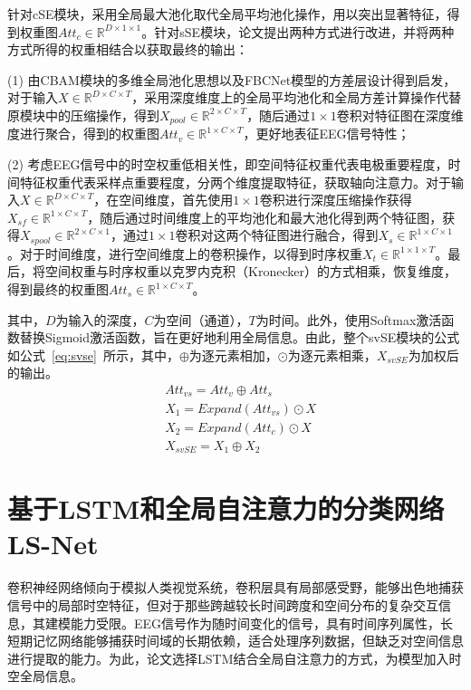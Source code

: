 针对cSE模块，采用全局最大池化取代全局平均池化操作，用以突出显著特征，得到权重图\(Att_c \in \mathbb{R}^{D \times 1 \times 1}\)。针对sSE模块，论文提出两种方式进行改进，并将两种方式所得的权重相结合以获取最终的输出：

(1) 由CBAM模块的多维全局池化思想以及FBCNet模型的方差层设计\cite{mane2021fbcnet}得到启发，对于输入\(X \in \mathbb{R}^{D \times C \times T}\)，采用深度维度上的全局平均池化和全局方差计算操作代替原模块中的压缩操作，得到\(X_{pool} \in \mathbb{R}^{2 \times C \times T}\)，随后通过\(1\times1\)卷积对特征图在深度维度进行聚合，得到的权重图\(Att_v \in \mathbb{R}^{1 \times C \times T}\)，更好地表征EEG信号特性；

(2) 考虑EEG信号中的时空权重低相关性，即空间特征权重代表电极重要程度，时间特征权重代表采样点重要程度，分两个维度提取特征，获取轴向注意力。对于输入\(X \in \mathbb{R}^{D \times C \times T}\)，在空间维度，首先使用\(1\times1\)卷积进行深度压缩操作获得\(X_{sf} \in \mathbb{R}^{1 \times C \times T}\)，随后通过时间维度上的平均池化和最大池化得到两个特征图，获得\(X_{spool} \in \mathbb{R}^{2 \times C \times 1}\)，通过\(1\times1\)卷积对这两个特征图进行融合，得到\(X_s \in \mathbb{R}^{1 \times C \times 1}\)。对于时间维度，进行空间维度上的卷积操作，以得到时序权重\(X_t \in \mathbb{R}^{1 \times 1 \times T}\)。最后，将空间权重与时序权重以克罗内克积（Kronecker）的方式相乘，恢复维度，得到最终的权重图\(Att_s \in \mathbb{R}^{1 \times C \times T}\)。

其中，\(D\)为输入的深度，\(C\)为空间（通道），\(T\)为时间。此外，使用Softmax激活函数替换Sigmoid激活函数，旨在更好地利用全局信息。由此，整个svSE模块的公式如公式~\ref{eq:svse}~所示，其中，\(\oplus\)为逐元素相加，\(\odot\)为逐元素相乘，\(X_{svSE}\)为加权后的输出。
\begin{equation}\label{eq:svse}
    \begin{aligned}
        &Att_{vs}=Att_v \oplus Att_s \\
        &X_1=Expand(Att_{vs}) \odot X \\
        &X_2=Expand(Att_c) \odot X \\
        &X_{svSE}=X_1 \oplus X_2
    \end{aligned}
\end{equation}

\section{基于LSTM和全局自注意力的分类网络LS-Net}

卷积神经网络倾向于模拟人类视觉系统，卷积层具有局部感受野，能够出色地捕获信号中的局部时空特征，但对于那些跨越较长时间跨度和空间分布的复杂交互信息，其建模能力受限。EEG信号作为随时间变化的信号，具有时间序列属性，长短期记忆网络能够捕获时间域的长期依赖，适合处理序列数据，但缺乏对空间信息进行提取的能力。为此，论文选择LSTM结合全局自注意力的方式，为模型加入时空全局信息。

